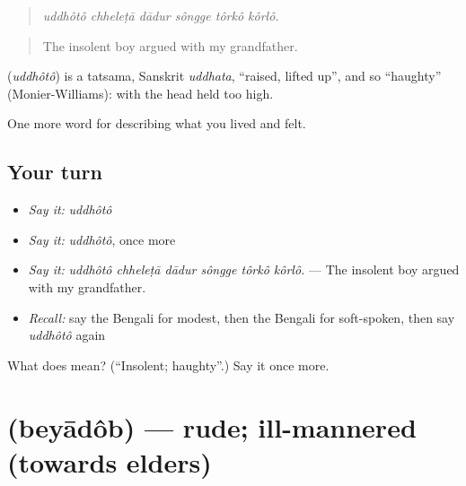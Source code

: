 \begin{quote}
     
\end{quote}

\begin{quote}
\emph{uddhôtô chheleṭā dādur sôngge tôrkô kôrlô.}
\end{quote}

\begin{quote}
The insolent boy argued with my grandfather.
\end{quote}

\begin{cousinweb}
\textbf{} (\emph{uddhôtô}) is a tatsama, Sanskrit \emph{uddhata}, \textquotedblleft{}raised, lifted up\textquotedblright{}, and so \textquotedblleft{}haughty\textquotedblright{} (Monier-Williams): with the head held too high.
\end{cousinweb}

\begin{grammarlens}[title={What you've built}]
One more word for describing what you lived and felt.
\end{grammarlens}

\subsection*{Your turn}
\begin{itemize}
\raggedright
  \item \emph{Say it:} \emph{uddhôtô}
  \item \emph{Say it:} \emph{uddhôtô}, once more
  \item \emph{Say it:} \emph{uddhôtô chheleṭā dādur sôngge tôrkô kôrlô.} — The insolent boy argued with my grandfather.
  \item \emph{Recall:} say the Bengali for modest, then the Bengali for soft-spoken, then say \emph{uddhôtô} again
\end{itemize}

\begin{tcolorbox}[breakable,colback=teal!4,colframe=teal!35!black,title={Before you move on}]
What does  mean? (\textquotedblleft{}Insolent; haughty\textquotedblright{}.) Say it once more.
\end{tcolorbox}
\section[\texorpdfstring{\bn{বেয়াদব} (beyādôb)}{বেয়াদব (beyādôb)}]{ (beyādôb) — rude; ill-mannered (towards elders)}

